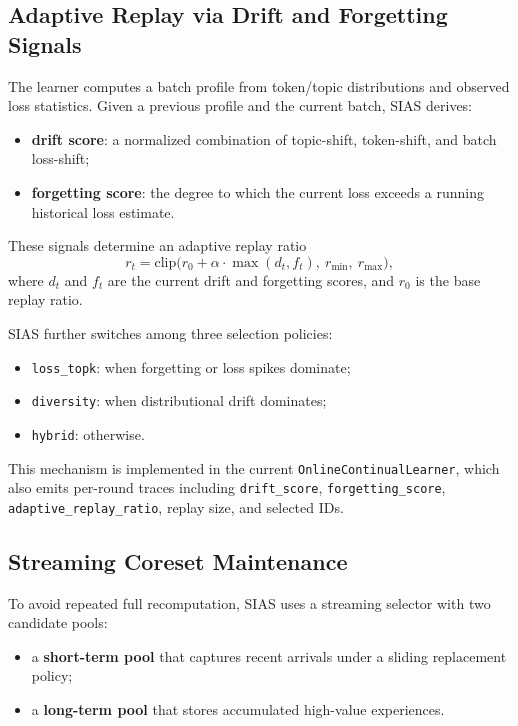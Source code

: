 \documentclass{article}
\begin{document}
\subsection{Adaptive Replay via Drift and Forgetting Signals}

The learner computes a batch profile from token/topic distributions and observed loss statistics. Given a previous profile and the current batch, SIAS derives:
\begin{itemize}[leftmargin=12pt]
    \item \textbf{drift score}: a normalized combination of topic-shift, token-shift, and batch loss-shift;
    \item \textbf{forgetting score}: the degree to which the current loss exceeds a running historical loss estimate.
\end{itemize}

These signals determine an adaptive replay ratio
\[
r_t = \mathrm{clip}\big(r_0 + \alpha \cdot \max(d_t, f_t),\ r_{\min},\ r_{\max}\big),
\]
where $d_t$ and $f_t$ are the current drift and forgetting scores, and $r_0$ is the base replay ratio.

SIAS further switches among three selection policies:
\begin{itemize}[leftmargin=12pt]
    \item \texttt{loss\_topk}: when forgetting or loss spikes dominate;
    \item \texttt{diversity}: when distributional drift dominates;
    \item \texttt{hybrid}: otherwise.
\end{itemize}

This mechanism is implemented in the current \texttt{OnlineContinualLearner}, which also emits per-round traces including \texttt{drift\_score}, \texttt{forgetting\_score}, \texttt{adaptive\_replay\_ratio}, replay size, and selected IDs.

\subsection{Streaming Coreset Maintenance}

To avoid repeated full recomputation, SIAS uses a streaming selector with two candidate pools:
\begin{itemize}[leftmargin=12pt]
    \item a \textbf{short-term pool} that captures recent arrivals under a sliding replacement policy;
    \item a \textbf{long-term pool} that stores accumulated high-value experiences.
\end{itemize}
\end{document}
